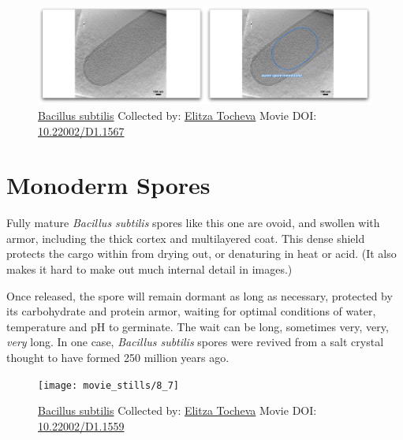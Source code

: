 \documentclass[]{tufte-book}
\begin{document}
\begin{figure}
\includegraphics{movie_stills/8_6b} \caption[\protect\hyperlink{tree}{Bacillus subtilis} Collected by:
\protect\hyperlink{elitza_tocheva}{Elitza Tocheva} Movie DOI:
\href{https://doi.org/10.22002/D1.1567}{10.22002/D1.1567}]{\protect\hyperlink{tree}{Bacillus subtilis} Collected by:
\protect\hyperlink{elitza_tocheva}{Elitza Tocheva} Movie DOI:
\href{https://doi.org/10.22002/D1.1567}{10.22002/D1.1567}}\label{fig:8-6b}
\end{figure}

\section{Monoderm Spores}\label{monoderm-spores}

Fully mature \emph{Bacillus subtilis} spores like this one are ovoid,
and swollen with armor, including the thick cortex and multilayered
coat. This dense shield protects the cargo within from drying out, or
denaturing in heat or acid. (It also makes it hard to make out much
internal detail in images.)

Once released, the spore will remain dormant as long as necessary,
protected by its carbohydrate and protein armor, waiting for optimal
conditions of water, temperature and pH to germinate. The wait can be
long, sometimes very, very, \emph{very} long. In one case,
\emph{Bacillus subtilis} spores were revived from a salt crystal thought
to have formed 250 million years ago.





\begin{figure}
\texttt{[image: movie\_stills/8\_7]} \caption[\protect\hyperlink{tree}{Bacillus subtilis} Collected by:
\protect\hyperlink{elitza_tocheva}{Elitza Tocheva} Movie DOI:
\href{https://doi.org/10.22002/D1.1559}{10.22002/D1.1559}]{\protect\hyperlink{tree}{Bacillus subtilis} Collected by:
\protect\hyperlink{elitza_tocheva}{Elitza Tocheva} Movie DOI:
\href{https://doi.org/10.22002/D1.1559}{10.22002/D1.1559}}\label{fig:8-7}
\end{figure}
\end{document}
